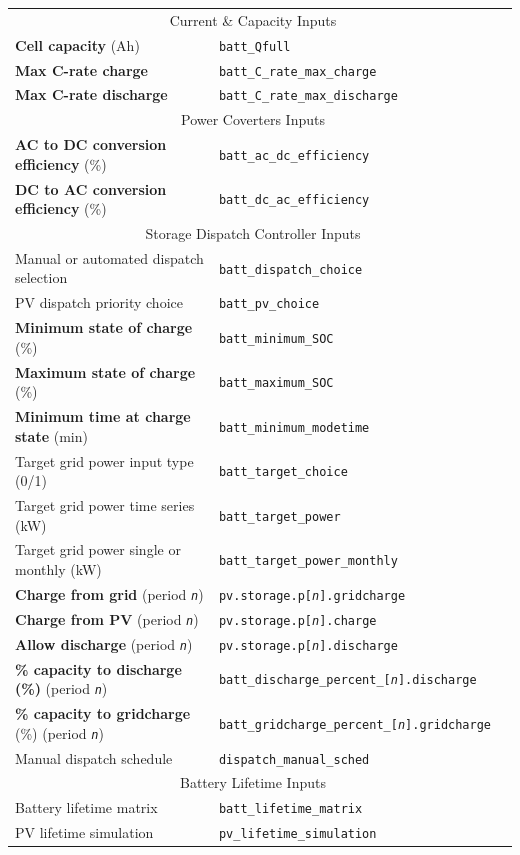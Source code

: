 \documentclass[12pt,letterpaper]{article}
\begin{document}
\begin{table}
\begin{center}
\begin{tabular}{lll}
\midrule
\multicolumn{2}{c}{Current \& Capacity Inputs}\\
\textbf{Cell capacity} (Ah) & \texttt{batt\_Qfull} \\
\textbf{Max C-rate charge} & \texttt{batt\_C\_rate\_max\_charge} \\
\textbf{Max C-rate discharge} & \texttt{batt\_C\_rate\_max\_discharge} \\
\midrule
\multicolumn{2}{c}{Power Coverters Inputs}\\
\textbf{AC to DC conversion efficiency} (\%) & \texttt{batt\_ac\_dc\_efficiency} \\
\textbf{DC to AC conversion efficiency} (\%) & \texttt{batt\_dc\_ac\_efficiency} \\
\midrule
\multicolumn{2}{c}{Storage Dispatch Controller Inputs}\\
Manual or automated dispatch selection & \texttt{batt\_dispatch\_choice} \\
PV dispatch priority choice & \texttt{batt\_pv\_choice} \\
\textbf{Minimum state of charge} (\%) & \texttt{batt\_minimum\_SOC} \\
\textbf{Maximum state of charge} (\%) & \texttt{batt\_maximum\_SOC} \\
\textbf{Minimum time at charge state} (min) & \texttt{batt\_minimum\_modetime} \\
Target grid power input type (0/1) & \texttt{batt\_target\_choice}\\
Target grid power time series (kW) & \texttt{batt\_target\_power}\\
Target grid power single or monthly (kW) & \texttt{batt\_target\_power\_monthly}\\
\textbf{Charge from grid} (period \texttt{\textit{n}}) & \texttt{pv.storage.p[\textit{n}].gridcharge} \\
\textbf{Charge from PV} (period \texttt{\textit{n}}) & \texttt{pv.storage.p[\textit{n}].charge} \\
\textbf{Allow discharge} (period \texttt{\textit{n}}) & \texttt{pv.storage.p[\textit{n}].discharge} \\
\textbf{\% capacity to discharge (\%)} (period \texttt{\textit{n}}) & \texttt{batt\_discharge\_percent\_[\textit{n}].discharge} \\
\textbf{\% capacity to gridcharge} (\%) (period \texttt{\textit{n}}) & \texttt{batt\_gridcharge\_percent\_[\textit{n}].gridcharge} \\
Manual dispatch schedule & \texttt{dispatch\_manual\_sched} \\
\midrule
\multicolumn{2}{c}{Battery Lifetime Inputs}\\
Battery lifetime matrix & \texttt{batt\_lifetime\_matrix} \\
PV lifetime simulation & \texttt{pv\_lifetime\_simulation} \\
\hline
\end{tabular}
\label{tab-batteryinputs}
\end{center}
\end{table}
\end{document}
